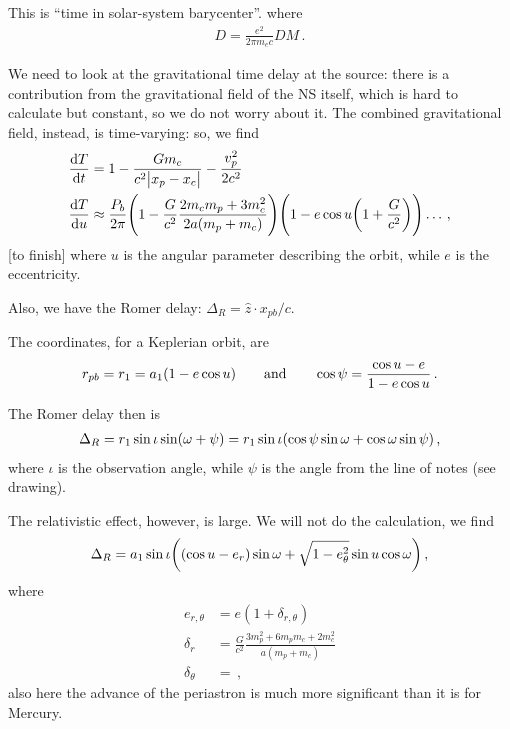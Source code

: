 \documentclass[main.tex]{subfiles}
\begin{document}
This is ``time in solar-system barycenter''.
where
%
\begin{align}
D = \frac{e^2}{2 \pi m_e c} DM
\,.
\end{align}

We need to look at the gravitational time delay at the source: there is a contribution from the gravitational field of the NS itself, which is hard to calculate but constant, so we do not worry about it. 
The combined gravitational field, instead, is time-varying: so, we find 
%
\begin{subequations}
\begin{align}
\dv{T}{t} &= 1 - \frac{G m_c}{c^2 \abs{x_p - x_c}} - \frac{v_p^2}{2 c^2}  \\
 \dv{T}{u} &\approx \frac{P_b}{2 \pi } \qty(1 - \frac{G}{c^2} \frac{2 m_c m_p + 3 m_c^2}{2 a (m_p + m_c)})\qty(1 - e \cos u \qty(1 + \frac{G}{c^2})) \dots
\,,
\end{align}
\end{subequations}
%
[to finish]
where \(u\) is the angular parameter describing the orbit, while \(e\) is the eccentricity.

Also, we have the Romer delay: \(\Delta_{R} = \hat{z} \cdot x_{pb} / c\). 

The coordinates, for a Keplerian orbit, are 
%
\begin{align}
r_{pb} = r_1 = a_1 \qty(1 - e \cos u )
\qquad \text{and} \qquad
\cos \psi = \frac{\cos u - e}{1- e \cos u}
\,.
\end{align}

The Romer delay then is 
%
\begin{align}
\Delta_{R} = r_1 \sin \iota \sin(\omega+\psi ) 
= r_1 \sin \iota \qty(\cos \psi \sin \omega + \cos \omega \sin \psi )
\,,
\end{align}
%
where \(\iota \) is the observation angle, while \(\psi \) is the angle from the line of notes (see drawing). 

The relativistic effect, however, is large. 
We will not do the calculation, we find 
%
\begin{align}
\Delta_{R} = a_1 \sin \iota 
\qty((\cos u - e_r ) \sin \omega + \sqrt{1 - e^2_{\theta }} \sin u \cos \omega )
\,, 
\end{align}
%
where 
%
\begin{subequations}
\begin{align}
e_{r, \theta } &= e (1 + \delta_{r, \theta })  \\
\delta_{r} &= \frac{G}{c^2} \frac{3 m_p^2 + 6 m_p m_c + 2 m_c^2}{a (m_p + m_c)}  \\
\delta_{\theta } &= 
\,,
\end{align}
\end{subequations}
%
also here the advance of the periastron is much more significant than it is for Mercury. 
\end{document}
